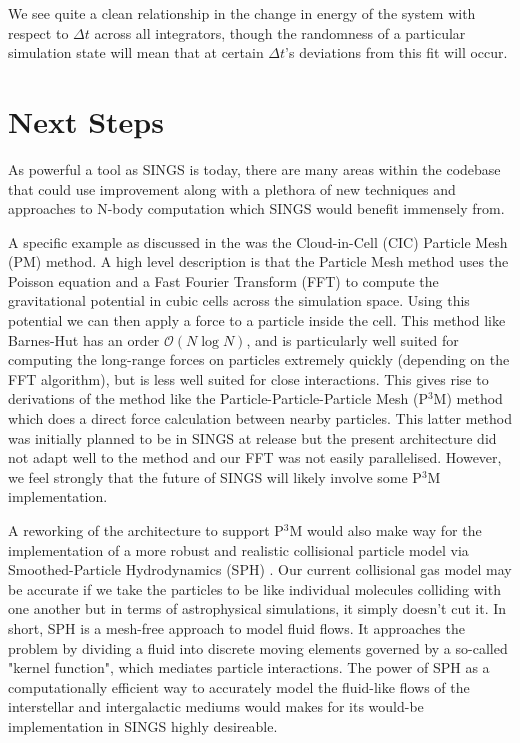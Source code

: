 \documentclass[12pt, twoside, letterpaper]{article}
\begin{document}
We see quite a clean relationship in the change in energy of the system with respect to $\Delta t$ across all integrators, though the randomness of a particular simulation state will mean that at certain $\Delta t$'s deviations from this fit will occur. 

\section{Next Steps} \label{sec:nextsteps}
As powerful a tool as SINGS is today, there are many areas within the codebase that could use improvement along with a plethora of new techniques and approaches to N-body computation which SINGS would benefit immensely from.

A specific example as discussed in the  was the Cloud-in-Cell (CIC) Particle Mesh (PM) method. A high level description is that the Particle Mesh method uses the Poisson equation and a Fast Fourier Transform (FFT) to compute the gravitational potential in cubic cells across the simulation space. Using this potential we can then apply a  force to a particle inside the cell. This method like Barnes-Hut has an order $\mathcal{O}(N \log N)$, and is particularly well suited for computing the long-range forces on particles extremely quickly (depending on the FFT algorithm), but is less well suited for close interactions. This gives rise to derivations of the method like the Particle-Particle-Particle Mesh (P$^3$M) method \citep{hockney1988particle} which does a direct force calculation between nearby particles. This latter method was initially planned to be in SINGS at release but the present architecture did not adapt well to the method and our FFT was not easily parallelised. However, we feel strongly that the future of SINGS will likely involve some P$^3$M implementation.

A reworking of the architecture to support P$^3$M would also make way for the implementation of a more robust and realistic collisional particle model via Smoothed-Particle Hydrodynamics (SPH) \citep{gingold1977smoothed}. Our current collisional gas model may be accurate if we take the particles to be like individual molecules colliding with one another but in terms of astrophysical simulations, it simply doesn't cut it. In short, SPH is a mesh-free approach to model fluid flows. It approaches the problem by dividing a fluid into discrete moving elements governed by a so-called "kernel function", which mediates particle interactions. The power of SPH as a computationally efficient way to accurately model the fluid-like flows of the interstellar and intergalactic mediums would makes for its would-be implementation in SINGS highly desireable. 
\end{document}
